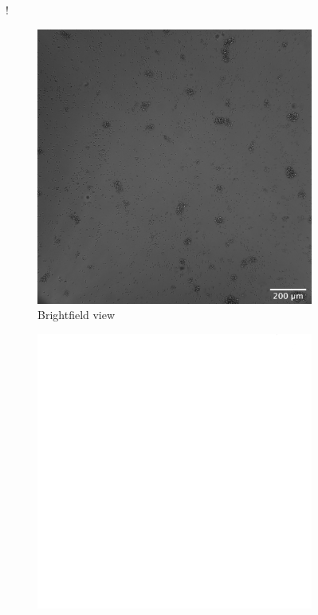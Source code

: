 \begin{figure}[h]!
    \centering
    \begin{subfigure}[h!]{0.3\textwidth}
        \includegraphics[width=\textwidth]{dissertation/figures/example_Brightfield_L20.jpg}
        \caption{Brightfield view}
        \label{fig:fov_brightfield}
    \end{subfigure}
    \begin{subfigure}[h!]{0.3\textwidth}
        \includegraphics[width=\textwidth]{dissertation/figures/example_FITC_L20.png}

\end{subfigure}
\end{figure}
